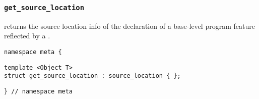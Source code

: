 

\subsubsection{\texttt{get\_source\_location}}

returns the source location info of the declaration of a base-level program feature reflected by a .

\begin{verbatim}
namespace meta {
\end{verbatim}
\begin{verbatim}
template <Object T>
struct get_source_location : source_location { };

\end{verbatim}
\begin{verbatim}
} // namespace meta
\end{verbatim}

